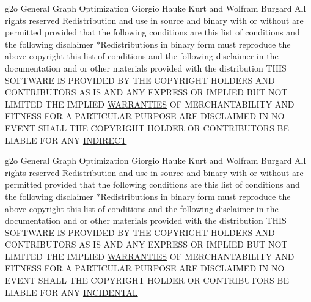 \begin{DoxyCompactItemize}
\item 
g2o General Graph Optimization Giorgio Hauke Kurt and Wolfram Burgard All rights reserved Redistribution and use in source and binary with or without are permitted provided that the following conditions are this list of conditions and the following disclaimer $\ast$Redistributions in binary form must reproduce the above copyright this list of conditions and the following disclaimer in the documentation and or other materials provided with the distribution T\+H\+IS S\+O\+F\+T\+W\+A\+RE IS P\+R\+O\+V\+I\+D\+ED BY T\+HE C\+O\+P\+Y\+R\+I\+G\+HT H\+O\+L\+D\+E\+RS A\+ND C\+O\+N\+T\+R\+I\+B\+U\+T\+O\+RS AS IS A\+ND A\+NY E\+X\+P\+R\+E\+SS OR I\+M\+P\+L\+I\+ED B\+UT N\+OT L\+I\+M\+I\+T\+ED T\+HE I\+M\+P\+L\+I\+ED \hyperlink{license-bsd_8txt_aada97a6c44c9b8b4b0cfb3a641d0fe51}{W\+A\+R\+R\+A\+N\+T\+I\+ES} OF M\+E\+R\+C\+H\+A\+N\+T\+A\+B\+I\+L\+I\+TY A\+ND F\+I\+T\+N\+E\+SS F\+OR A P\+A\+R\+T\+I\+C\+U\+L\+AR P\+U\+R\+P\+O\+SE A\+RE D\+I\+S\+C\+L\+A\+I\+M\+ED IN NO E\+V\+E\+NT S\+H\+A\+LL T\+HE C\+O\+P\+Y\+R\+I\+G\+HT H\+O\+L\+D\+ER OR C\+O\+N\+T\+R\+I\+B\+U\+T\+O\+RS BE L\+I\+A\+B\+LE F\+OR A\+NY \hyperlink{license-bsd_8txt_a2e3fc6f58f82d01c0e8de42d17c7a7df}{I\+N\+D\+I\+R\+E\+CT}
\item 
g2o General Graph Optimization Giorgio Hauke Kurt and Wolfram Burgard All rights reserved Redistribution and use in source and binary with or without are permitted provided that the following conditions are this list of conditions and the following disclaimer $\ast$Redistributions in binary form must reproduce the above copyright this list of conditions and the following disclaimer in the documentation and or other materials provided with the distribution T\+H\+IS S\+O\+F\+T\+W\+A\+RE IS P\+R\+O\+V\+I\+D\+ED BY T\+HE C\+O\+P\+Y\+R\+I\+G\+HT H\+O\+L\+D\+E\+RS A\+ND C\+O\+N\+T\+R\+I\+B\+U\+T\+O\+RS AS IS A\+ND A\+NY E\+X\+P\+R\+E\+SS OR I\+M\+P\+L\+I\+ED B\+UT N\+OT L\+I\+M\+I\+T\+ED T\+HE I\+M\+P\+L\+I\+ED \hyperlink{license-bsd_8txt_aada97a6c44c9b8b4b0cfb3a641d0fe51}{W\+A\+R\+R\+A\+N\+T\+I\+ES} OF M\+E\+R\+C\+H\+A\+N\+T\+A\+B\+I\+L\+I\+TY A\+ND F\+I\+T\+N\+E\+SS F\+OR A P\+A\+R\+T\+I\+C\+U\+L\+AR P\+U\+R\+P\+O\+SE A\+RE D\+I\+S\+C\+L\+A\+I\+M\+ED IN NO E\+V\+E\+NT S\+H\+A\+LL T\+HE C\+O\+P\+Y\+R\+I\+G\+HT H\+O\+L\+D\+ER OR C\+O\+N\+T\+R\+I\+B\+U\+T\+O\+RS BE L\+I\+A\+B\+LE F\+OR A\+NY \hyperlink{license-bsd_8txt_ae70dc8dc15071b5e6c79dea302039859}{I\+N\+C\+I\+D\+E\+N\+T\+AL}
\item 

\end{DoxyCompactItemize}
